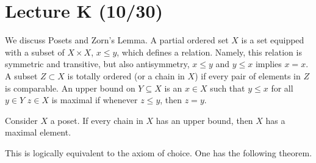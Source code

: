 
\section{Lecture K (10/30)}
We discuss Posets and Zorn's Lemma. A partial ordered set $X$ is a set equipped with a subset of $X \times X$,
$x \le y$, which defines a relation. Namely, this relation is symmetric and transitive, but also antisymmetry,
$x\le y$ and $y \le x$ implies $x = x$. A subset $Z \subset X$ is totally ordered (or a chain in $X$) if every pair of elements in $Z$ is comparable.
An upper bound on $Y \subseteq X$ is an $x \in X$ 
such that $y \le x$ for all $y \in Y$
$z \in X$ is maximal if whenever $z \le y$, then $z = y$.

\begin{theorem} 
    Consider $X$ a poset. If every chain in $X$ has an upper bound, then $X$ has a maximal element.
\end{theorem}
This is logically equivalent to the axiom of choice. One has the following theorem.
